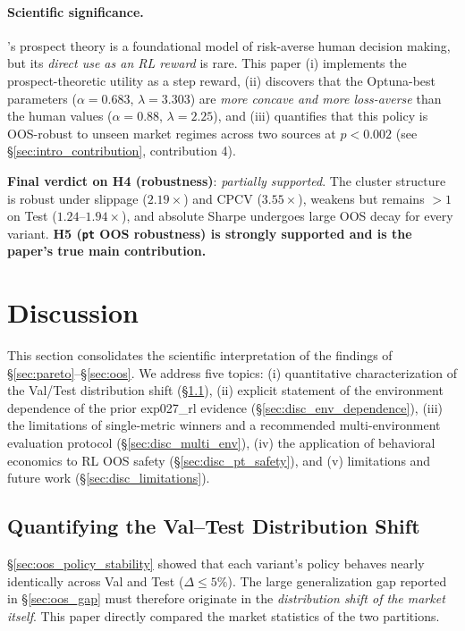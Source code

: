 \documentclass[11pt, a4paper]{article}
\begin{document}
\paragraph{Scientific significance.}
\citet{kahneman1979prospect}'s prospect theory is a foundational model of
risk-averse human decision making, but its \emph{direct use as an RL reward}
is rare. This paper (i) implements the prospect-theoretic utility as a
step reward, (ii) discovers that the Optuna-best parameters
($\alpha = 0.683$, $\lambda = 3.303$) are \emph{more concave and more
loss-averse} than the human values ($\alpha = 0.88$, $\lambda = 2.25$), and
(iii) quantifies that this policy is OOS-robust to unseen market regimes
across two sources at $p < 0.002$
(see \S\ref{sec:intro_contribution}, contribution 4).

\textbf{Final verdict on H4 (robustness)}: \emph{partially supported}. The
cluster structure is robust under slippage ($2.19\times$) and CPCV
($3.55\times$), weakens but remains $> 1$ on Test ($1.24$--$1.94\times$),
and absolute Sharpe undergoes large OOS decay for every variant.
\textbf{H5 (\texttt{pt} OOS robustness) is strongly supported and is the
paper's true main contribution.}

\section{Discussion}
\label{sec:discussion}

This section consolidates the scientific interpretation of the findings of
\S\ref{sec:pareto}--\S\ref{sec:oos}. We address five topics: (i) quantitative
characterization of the Val/Test distribution shift (\S\ref{sec:disc_shift}),
(ii) explicit statement of the environment dependence of the prior
exp027\_rl evidence (\S\ref{sec:disc_env_dependence}), (iii) the limitations
of single-metric winners and a recommended multi-environment evaluation
protocol (\S\ref{sec:disc_multi_env}), (iv) the application of behavioral
economics to RL OOS safety (\S\ref{sec:disc_pt_safety}), and (v) limitations
and future work (\S\ref{sec:disc_limitations}).

\subsection{Quantifying the Val--Test Distribution Shift}
\label{sec:disc_shift}

\S\ref{sec:oos_policy_stability} showed that each variant's policy behaves
nearly identically across Val and Test ($\Delta \leq 5\%$). The large
generalization gap reported in \S\ref{sec:oos_gap} must therefore originate in
the \emph{distribution shift of the market itself}. This paper directly
compared the market statistics of the two partitions.
\end{document}

